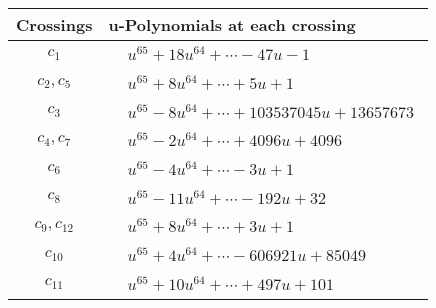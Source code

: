 \documentclass[1p]{elsarticle_modified}
\theoremstyle{definition}
\begin{document}
\begin{tabular}{m{50pt}|m{274pt}}
Crossings & \hspace{64pt}u-Polynomials at each crossing \\
\hline $$\begin{aligned}c_{1}\end{aligned}$$&$\begin{aligned}
&u^{65}+18 u^{64}+\cdots-47 u-1
\end{aligned}$\\
\hline $$\begin{aligned}c_{2},c_{5}\end{aligned}$$&$\begin{aligned}
&u^{65}+8 u^{64}+\cdots+5 u+1
\end{aligned}$\\
\hline $$\begin{aligned}c_{3}\end{aligned}$$&$\begin{aligned}
&u^{65}-8 u^{64}+\cdots+103537045 u+13657673
\end{aligned}$\\
\hline $$\begin{aligned}c_{4},c_{7}\end{aligned}$$&$\begin{aligned}
&u^{65}-2 u^{64}+\cdots+4096 u+4096
\end{aligned}$\\
\hline $$\begin{aligned}c_{6}\end{aligned}$$&$\begin{aligned}
&u^{65}-4 u^{64}+\cdots-3 u+1
\end{aligned}$\\
\hline $$\begin{aligned}c_{8}\end{aligned}$$&$\begin{aligned}
&u^{65}-11 u^{64}+\cdots-192 u+32
\end{aligned}$\\
\hline $$\begin{aligned}c_{9},c_{12}\end{aligned}$$&$\begin{aligned}
&u^{65}+8 u^{64}+\cdots+3 u+1
\end{aligned}$\\
\hline $$\begin{aligned}c_{10}\end{aligned}$$&$\begin{aligned}
&u^{65}+4 u^{64}+\cdots-606921 u+85049
\end{aligned}$\\
\hline $$\begin{aligned}c_{11}\end{aligned}$$&$\begin{aligned}
&u^{65}+10 u^{64}+\cdots+497 u+101
\end{aligned}$\\
\hline
\end{tabular}\\~\\
\end{document}
